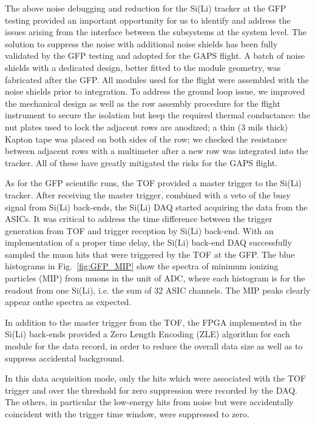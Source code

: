 The above noise debugging and reduction for the \ac{Si(Li)} tracker at the \ac{GFP} testing provided an important opportunity for us to identify and address the issues arising from the interface between the subsystems at the system level. The solution to suppress the noise with additional noise shields has been fully validated by the \ac{GFP} testing and adopted for the \ac{GAPS} flight. A batch of noise shields with a dedicated design, better fitted to the module geometry, was fabricated after the \ac{GFP}. All modules used for the flight were assembled with the noise shields prior to integration. To address the ground loop issue, we improved the mechanical design as well as the row assembly procedure for the flight instrument to secure the isolation but keep the required thermal conductance: the nut plates used to lock the adjacent rows are anodized; a thin (3 mils thick) Kapton tape was placed on both sides of the row; we checked the resistance between adjacent rows with a multimeter after a new row was integrated into the tracker. All of these have greatly mitigated the risks for the \ac{GAPS} flight.

As for the \ac{GFP} scientific runs, the \ac{TOF} provided a master trigger to the \ac{Si(Li)} tracker. After receiving the master trigger, combined with a veto of the busy signal from \ac{Si(Li)} back-ends, the \ac{Si(Li)} DAQ started acquiring the data from the ASICs. It was critical to address the time difference between the trigger generation from \ac{TOF} and trigger reception by \ac{Si(Li)} back-end. With an implementation of a proper time delay, the \ac{Si(Li)} back-end DAQ successfully sampled the muon hits that were triggered by the \ac{TOF} at the \ac{GFP}. The blue histograms in Fig.~\ref{fig:GFP_MIP} show the spectra of minimum ionizing particles (MIP) from muons in the unit of ADC, where each histogram is for the readout from one \ac{Si(Li)}, i.e. the sum of 32 ASIC channels. The \ac{MIP} peaks clearly appear onthe spectra as expected.

In addition to the master trigger from the \ac{TOF}, the FPGA implemented in the \ac{Si(Li)} back-ends provided a Zero Length Encoding (ZLE) algorithm for each module for the data record, in order to reduce the overall data size as well as to suppress accidental background. 

In this data acquisition mode, only the hits which were associated with the \ac{TOF} trigger and over the threshold for zero suppression were recorded by the DAQ. The others, in particular the low-energy hits from noise but were accidentally coincident with the trigger time window, were suppressed to zero. 

